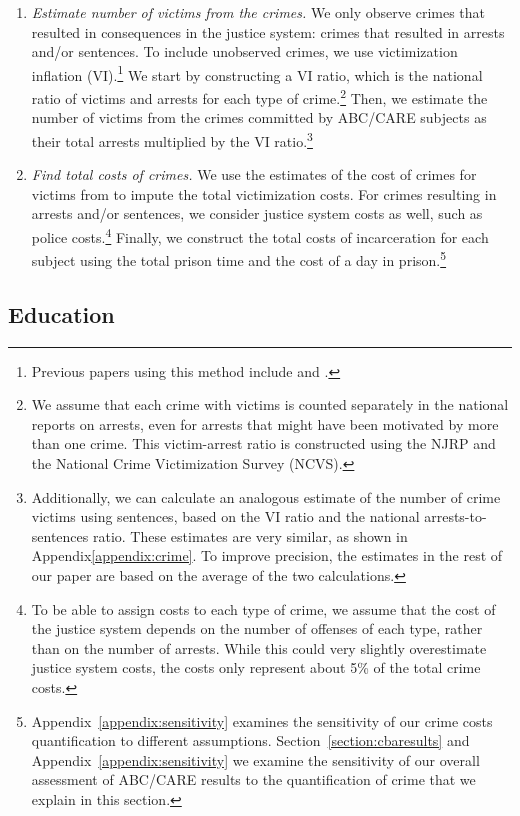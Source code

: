 \begin{enumerate}
\item \textit{Estimate number of victims from the crimes.} We only observe crimes that resulted in consequences in the justice system: crimes that resulted in arrests and/or sentences. To include unobserved crimes, we use victimization inflation (VI).\footnote{Previous papers using this method include \citet{Belfield_Nores_etal_2006_JHR} and \cite{Heckman_Moon_etal_2010_RateofReturn}.} We start by constructing a VI ratio, which is the national ratio of victims and arrests for each type of crime.\footnote{We assume that each crime with victims is counted separately in the national reports on arrests, even for arrests that might have been motivated by more than one crime. This victim-arrest ratio is constructed using the NJRP and the National Crime Victimization Survey (NCVS).} Then, we estimate the number of victims from the crimes committed by ABC/CARE subjects as their total arrests multiplied by the VI ratio.\footnote{Additionally, we can calculate an analogous estimate of the number of crime victims using sentences, based on the VI ratio and the national arrests-to-sentences ratio. These estimates are very similar, as shown in Appendix\ref{appendix:crime}. To improve precision, the estimates in the rest of our paper are based on the average of the two calculations.}

\item \textit{Find total costs of crimes.} We use the estimates of the cost of crimes for victims from \cite{McCollister_etal_2010_DAD} to impute the total victimization costs. For crimes resulting in arrests and/or sentences, we consider justice system costs as well, such as police costs.\footnote{To be able to assign costs to each type of crime, we assume that the cost of the justice system depends on the number of offenses of each type, rather than on the number of arrests. While this could very slightly overestimate justice system costs, the costs only represent about 5\% of the total crime costs.} Finally, we construct the total costs of incarceration for each subject using the total prison time and the cost of a day in prison.\footnote{ Appendix~\ref{appendix:sensitivity} examines the sensitivity of our crime costs quantification to different assumptions. Section~\ref{section:cbaresults} and  Appendix~\ref{appendix:sensitivity} we examine the sensitivity of our overall assessment of ABC/CARE results to the quantification of crime that we explain in this section.}
\end{enumerate}

\subsection{Education}

